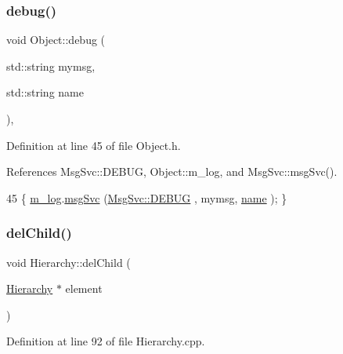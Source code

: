 \subsubsection{\texorpdfstring{debug()}{debug()}\hspace{0.1cm}{\footnotesize\ttfamily [2/2]}}
{\footnotesize\ttfamily void Object\+::debug (\begin{DoxyParamCaption}\item[{std\+::string}]{mymsg,  }\item[{std\+::string}]{name }\end{DoxyParamCaption})\hspace{0.3cm}{\ttfamily [inline]}, {\ttfamily [inherited]}}



Definition at line 45 of file Object.\+h.



References Msg\+Svc\+::\+D\+E\+B\+UG, Object\+::m\+\_\+log, and Msg\+Svc\+::msg\+Svc().


\begin{DoxyCode}
45 \{ \hyperlink{classObject_a0d269813dd7ac1f24bc143031e2963f2}{m\_log}.\hyperlink{classMsgSvc_ad25f18047920cc59a314e5098259711c}{msgSvc} (\hyperlink{classMsgSvc_ae671eb7301996cd049d2da8a65925926a1dbdcc82dce88370ec335883c83b38b0}{MsgSvc::DEBUG}   , mymsg, \hyperlink{classObject_a300f4c05dd468c7bb8b3c968868443c1}{name} ); \}
\end{DoxyCode}
\mbox{\label{classHierarchy_a2b2b359fac003233f65786a616766bde}} 
\subsubsection{\texorpdfstring{del\+Child()}{delChild()}\hspace{0.1cm}{\footnotesize\ttfamily [1/2]}}
{\footnotesize\ttfamily void Hierarchy\+::del\+Child (\begin{DoxyParamCaption}\item[{\hyperlink{classHierarchy}{Hierarchy} $\ast$}]{element }\end{DoxyParamCaption})\hspace{0.3cm}{\ttfamily [inherited]}}



Definition at line 92 of file Hierarchy.\+cpp.



